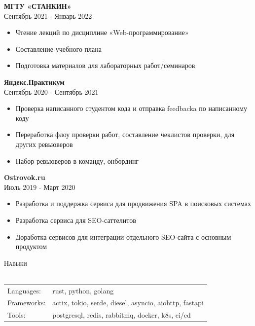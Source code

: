 \documentclass[a4paper]{article}
\newcommand{\lineunder} {
    \vspace*{-8pt} \\
    \hspace*{-18pt} \hrulefill \\
}
\newcommand{\header} [1] {
    {\hspace*{-18pt}\vspace*{6pt} \textsc{#1}}
    \vspace*{-6pt} \lineunder
}
\begin{document}
\textbf{МГТУ «СТАНКИН»} \\
 \hfill Сентябрь 2021 - Январь 2022\\
\vspace{-1mm}
\begin{itemize} \itemsep -1pt
    \item Чтение лекций по дисциплине «Web-программирование»
    \item Составление учебного плана
    \item Подготовка материалов для лабораторных работ/семинаров
\end{itemize}

\textbf{Яндекс.Практикум} \\
 \hfill Сентябрь 2020 - Сентябрь 2021\\
\vspace{-1mm}
\begin{itemize} \itemsep -1pt
    \item Проверка написанного студентом кода и отправка feedback\textquotesingle{}a по написанному коду
    \item Переработка флоу проверки работ, составление чеклистов проверки, для других ревьюверов
    \item Набор ревьюверов в команду, онбординг
\end{itemize}

\textbf{Ostrovok.ru} \\
 \hfill Июль 2019 - Март 2020\\
\vspace{-1mm}
\begin{itemize} \itemsep -1pt
    \item Разработка и поддержка сервиса для продвижения SPA в поисковых системах
    \item Разработка сервиса для SEO-саттелитов
    \item Доработка сервисов для интеграции отдельного SEO-сайта с основным продуктом
\end{itemize}

\header{Навыки}
\begin{tabular}{ l l }
	Languages:  & rust, python, golang \\
	Frameworks: & actix, tokio, serde, diesel, asyncio, aiohttp, fastapi \\
    Tools:      & postgresql, redis, rabbitmq, docker, k8s, ci/cd \\
\end{tabular}
\vspace{2mm}
\end{document}
